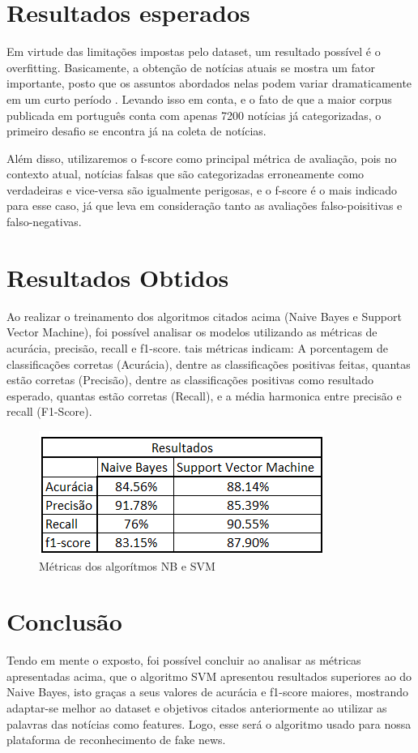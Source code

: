 \documentclass[conference]{IEEEtran}
\begin{document}
\section{Resultados esperados}
Em virtude das limitações impostas pelo dataset, um resultado possível é o overfitting. Basicamente, a obtenção de notícias atuais se mostra um fator importante, posto que os assuntos abordados nelas podem variar dramaticamente em um curto período \cite{b7}. Levando isso em conta, e o fato de que a maior corpus publicada em português conta com apenas 7200 notícias já categorizadas, o primeiro desafio se encontra já na coleta de notícias.

Além disso, utilizaremos o f-score como principal métrica de avaliação, pois no contexto atual, notícias falsas que são categorizadas erroneamente como verdadeiras e vice-versa são igualmente perigosas, e o f-score é o mais indicado para esse caso, já que leva em consideração tanto as avaliações falso-poisitivas e falso-negativas.

\section{Resultados Obtidos}
Ao realizar o treinamento dos algoritmos citados acima (Naive Bayes e Support Vector Machine), foi possível analisar os modelos utilizando as métricas de acurácia, precisão, recall e f1-score. tais métricas indicam: A porcentagem de classificações corretas (Acurácia), dentre as classificações positivas feitas, quantas estão corretas (Precisão), dentre as classificações positivas como resultado esperado, quantas estão corretas (Recall), e a média harmonica entre precisão e recall (F1-Score). 

\begin{figure}[htbp]
\centerline{\includegraphics[scale=0.7]{resultados.png}}
\caption{Métricas dos algorítmos NB e SVM}
\label{fig}
\end{figure}


\section{Conclusão}
Tendo em mente o exposto, foi possível concluir ao analisar as métricas apresentadas acima, que o algoritmo SVM apresentou resultados superiores ao do Naive Bayes, isto graças a seus valores de acurácia e f1-score maiores, mostrando adaptar-se melhor ao dataset e objetivos citados anteriormente ao utilizar as palavras das notícias como features. Logo, esse será o algoritmo usado para nossa plataforma de reconhecimento de fake news. 
\end{document}

